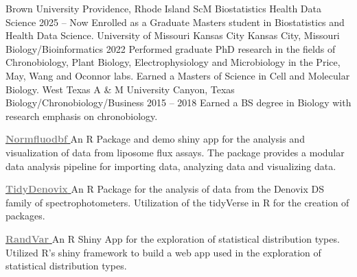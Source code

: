 \documentclass[9pt]{adeckcv} %
\begin{document}

\newpage


  

\begin{entrylist}
\entry
{\large{Brown University}} 
{Providence, Rhode Island}
{ScM Biostatistics Health Data Science}
{2025 -- Now}
{\itemizeeducationtwo
  {Enrolled as a Graduate Masters student in Biostatistics and Health Data Science.}
}
\entry
{\large{University of Missouri Kansas City}} 
{Kansas City, Missouri}
{Biology/Bioinformatics}
{2022}
{\itemizeeducationone
  {Performed graduate PhD research in the fields of Chronobiology, Plant Biology, Electrophysiology and Microbiology in the Price, May, Wang and Oconnor labs.}
  {Earned a Masters of Science in Cell and Molecular Biology.}
}
\entry
{\large{West Texas A \& M University}} 
{Canyon, Texas}
{Biology/Chronobiology/Business}
{2015 -- 2018}
{\itemizeeducationtwo
  {Earned a BS degree in Biology with research emphasis on chronobiology.}
}
\end{entrylist}

  

\project
{\href{https://alphaprime7.github.io/normfluodbf/}{\textbf{ \textcolor{gray}{Normfluodbf}} }}
{}
{}
{}
{An R Package and demo shiny app for the analysis and visualization of data from liposome flux assays.}
{The package provides a modular data analysis pipeline for importing data, analyzing data and visualizing data.}

\project
{\href{https://alphaprime7.github.io/tidyDenovix/}{\textbf{ \textcolor{gray}{TidyDenovix}} }}
{}
{}
{}
{An R Package for the analysis of data from the Denovix DS family of spectrophotometers.}
{Utilization of the tidyVerse in R for the creation of packages.}

\project
{\href{https://github.com/bhds2010/randvar}{\textbf{ \textcolor{gray}{RandVar}} }}
{}
{}
{}
{An R Shiny App for the exploration of statistical distribution types.}
{Utilized R's shiny framework to build a web app used in the exploration of statistical distribution types.}
\end{document}
